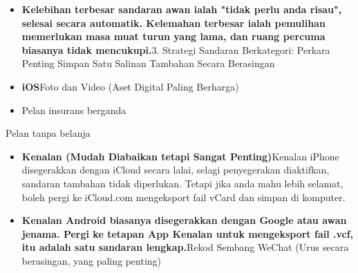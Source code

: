 
\begin{itemize}
  \item \textbf{Kelebihan terbesar sandaran awan ialah "tidak perlu anda risau", selesai secara automatik. Kelemahan terbesar ialah pemulihan memerlukan masa muat turun yang lama, dan ruang percuma biasanya tidak mencukupi.}3. Strategi Sandaran Berkategori: Perkara Penting Simpan Satu Salinan Tambahan Secara Berasingan
  \item \textbf{iOS}Foto dan Video (Aset Digital Paling Berharga)
  \item Pelan insurans berganda
\end{itemize}


Pelan tanpa belanja


\begin{itemize}
  \item \textbf{Kenalan (Mudah Diabaikan tetapi Sangat Penting)}Kenalan iPhone disegerakkan dengan iCloud secara lalai, selagi penyegerakan diaktifkan, sandaran tambahan tidak diperlukan. Tetapi jika anda mahu lebih selamat, boleh pergi ke iCloud.com mengeksport fail vCard dan simpan di komputer.
  \item \textbf{Kenalan Android biasanya disegerakkan dengan Google atau awan jenama. Pergi ke tetapan App Kenalan untuk mengeksport fail .vcf, itu adalah satu sandaran lengkap.}Rekod Sembang WeChat (Urus secara berasingan, yang paling penting)
\end{itemize}


